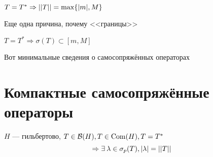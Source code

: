 \documentclass[document]{subfiles}
\begin{document}
\begin{remark}
    $T = T^* \Rightarrow \left|\left| {T} \right| \right| = \max\{ |m|, M \}$
\end{remark}
Еще одна причина, почему <<границы>>
\begin{remark}
    $T = T^* \Rightarrow \sigma(T) \subset [m, M]$
\end{remark}

Вот минимальные сведения о самосопряжённых операторах 

\section{Компактные самосопряжённые операторы}

\begin{theorem}
    $H$ --- гильбертово, $T \in \mathcal{B}(H), T \in \operatorname{Com}(H), T = T^*$
    \[ \Rightarrow \exists \lambda \in \sigma_p(T), \abs{\lambda} = \norm{T} \]
\end{theorem}
\end{document}
